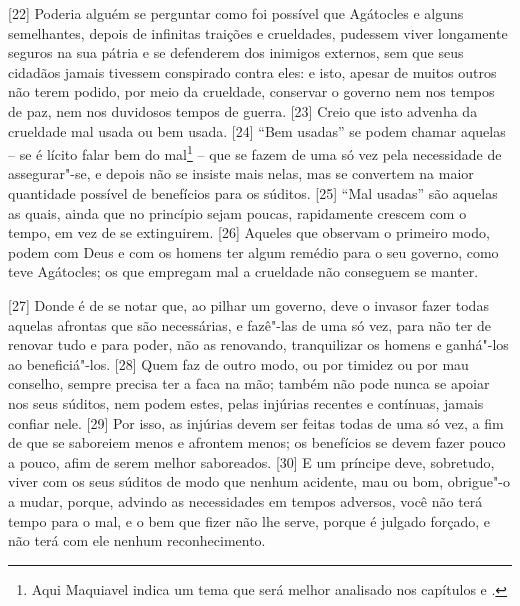 {[}22{]} Poderia alguém se perguntar como foi possível que Agátocles e
alguns semelhantes, depois de infinitas traições e crueldades, pudessem
viver longamente seguros na sua pátria e se defenderem dos inimigos
externos, sem que seus cidadãos jamais tivessem conspirado contra eles:
e isto, apesar de muitos outros não terem podido, por meio da crueldade,
conservar o governo nem nos tempos de paz, nem nos duvidosos tempos de
guerra. {[}23{]} Creio que isto advenha da crueldade mal usada ou bem
usada. {[}24{]} ``Bem usadas'' se podem chamar aquelas -- se é lícito
falar bem do mal\footnote{Aqui Maquiavel indica um tema que será melhor
  analisado nos capítulos  e .} -- que se fazem de uma só vez pela
necessidade de assegurar"-se, e depois não se insiste mais nelas, mas se
convertem na maior quantidade possível de benefícios para os súditos.
{[}25{]} ``Mal usadas'' são aquelas as quais, ainda que no princípio
sejam poucas, rapidamente crescem com o tempo, em vez de se extinguirem.
{[}26{]} Aqueles que observam o primeiro modo, podem com Deus e com os
homens ter algum remédio para o seu governo, como teve Agátocles; os que
empregam mal a crueldade não conseguem se manter.

{[}27{]} Donde é de se notar que, ao pilhar um governo, deve o invasor
fazer todas aquelas afrontas que são necessárias, e fazê"-las de uma só
vez, para não ter de renovar tudo e para poder, não as renovando,
tranquilizar os homens e ganhá"-los ao beneficiá"-los. {[}28{]} Quem faz
de outro modo, ou por timidez ou por mau conselho, sempre precisa ter a
faca na mão; também não pode nunca se apoiar nos seus súditos, nem podem
estes, pelas injúrias recentes e contínuas, jamais confiar nele.
{[}29{]} Por isso, as injúrias devem ser feitas todas de uma só vez, a
fim de que se saboreiem menos e afrontem menos; os benefícios se devem
fazer pouco a pouco, afim de serem melhor saboreados. {[}30{]} E um
príncipe deve, sobretudo, viver com os seus súditos de modo que nenhum
acidente, mau ou bom, obrigue"-o a mudar, porque, advindo as necessidades
em tempos adversos, você não terá tempo para o mal, e o bem que fizer
não lhe serve, porque é julgado forçado, e não terá com ele nenhum
reconhecimento.


